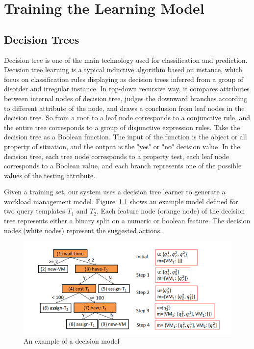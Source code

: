 \chapter{Training the Learning Model}
\section{Decision Trees}
Decision tree \cite{quinlan1987simplifying} is one of the main technology used for classification and prediction. Decision tree learning \cite{quinlan1987simplifying} is a typical inductive algorithm based on instance, which focus on classification rules displaying as decision trees inferred from a group of disorder and irregular instance. In top-down recursive way, it compares attributes between internal nodes of decision tree, judges the downward branches according to different attribute of the node, and draws a conclusion from leaf nodes in the decision tree. So from a root to a leaf node corresponds to a conjunctive rule, and the entire tree corresponds to a group of disjunctive expression rules. Take the decision tree as a Boolean function. The input of the function is the object or all property of situation, and the output is the "yes" or "no" decision value. In the decision tree, each tree node corresponds to a property test, each leaf node corresponds to a Boolean value, and each branch represents one of the possible values of the testing attribute.

Given a training set, our system uses a decision tree learner to generate a workload management model. Figure~\ref{fig:decision_tree} shows an example model defined for two query templates \(T_1\) and \(T_2\). Each feature node (orange node) of the decision tree represents either a binary split on a numeric or boolean feature. The decision nodes (white nodes) represent the suggested actions. 

\begin{figure}
\centering
\includegraphics[width=1.0\textwidth]{decisiontree.PNG}
\caption{\label{fig:decision_tree}An example of a decision model}
\end{figure}

